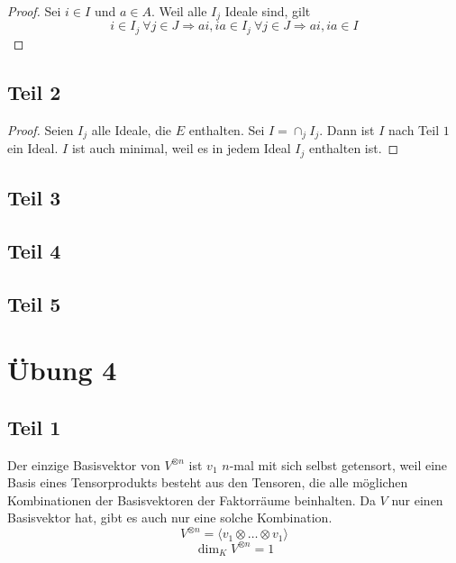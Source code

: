 \documentclass[10pt,a4paper]{article}
\begin{document}
\begin{proof}
Sei $i \in I$ und $a \in A$.
Weil alle $I_{j}$ Ideale sind, gilt
\begin{equation}
i \in I_{j}\ \forall j \in J \Rightarrow ai, ia \in I_{j}\ \forall j \in J \Rightarrow ai, ia \in I
\end{equation}
\end{proof}

\subsection*{Teil 2}

\begin{proof}
Seien $I_{j}$ alle Ideale, die $E$ enthalten.
Sei $I = \cap_{j} I_{j}$.
Dann ist $I$ nach Teil $1$ ein Ideal.
$I$ ist auch minimal, weil es in jedem Ideal $I_{j}$ enthalten ist.
\end{proof}

\subsection*{Teil 3}

\subsection*{Teil 4}

\subsection*{Teil 5}

\section*{Übung 4}

\subsection*{Teil 1}

Der einzige Basisvektor von $V^{\otimes n}$ ist $v_{1}$ $n$-mal mit sich selbst getensort,
weil eine Basis eines Tensorprodukts besteht aus den Tensoren, die alle möglichen Kombinationen der Basisvektoren der Faktorräume beinhalten.
Da $V$ nur einen Basisvektor hat, gibt es auch nur eine solche Kombination.
\begin{equation}
V^{\otimes n} = \langle v_{1} \otimes \dots \otimes v_{1} \rangle
\end{equation}
\begin{equation}
\dim_{K} V^{\otimes n} = 1
\end{equation}
\end{document}
